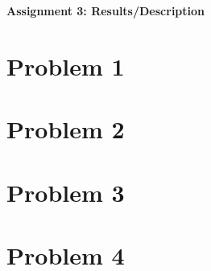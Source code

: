 \documentclass[12pt]{article}
\begin{document}
\begin{center}\begin{LARGE}
\textbf{Assignment 3: Results/Description}
\end{LARGE}\end{center}

\section*{Problem 1}



\section*{Problem 2}



\section*{Problem 3}



\section*{Problem 4}
\end{document}
